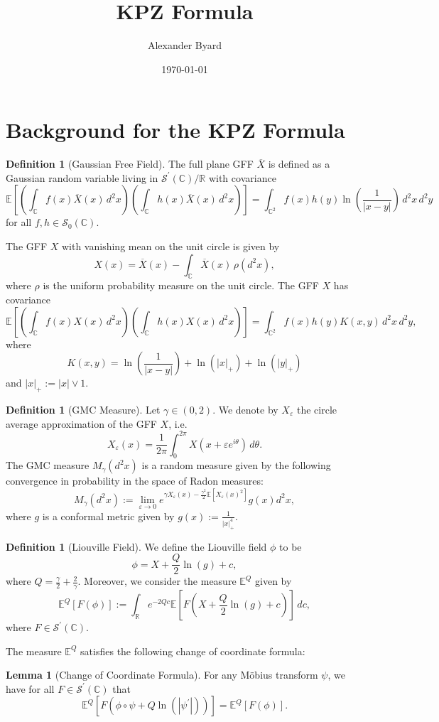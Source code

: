 \documentclass[reqno]{amsart}
\title{KPZ Formula}
\author{Alexander Byard}
\date{\today}
\let\mc\mathcal
\newcommand{\id}[4]{\int_{#1}^{#2}#3\,d#4}
\newcommand{\idd}[4]{\int_{#1}^{#2}#3\,d^2#4}
\newcommand{\im}[4]{\int_{#1}^{#2}#3\,#4}
\newcommand{\p}{\prime}
\renewcommand{\l}{\left}
\renewcommand{\r}{\right}
\newcommand{\ol}{\overline}
\newcommand{\R}{\mathbb{R}}
\newcommand{\C}{\mathbb{C}}
\newcommand{\E}{\mathbb{E}}
\renewcommand{\epsilon}{\varepsilon}
\newcommand{\e}{\epsilon}
\theoremstyle{definition}
\newtheorem{lemma}[theorem]{Lemma}
\newtheorem{definition}[theorem]{Definition}
\begin{document}
\maketitle

\section{Background for the KPZ Formula}

\begin{definition}[Gaussian Free Field]
The full plane GFF $\ol{X}$ is defined as a Gaussian random variable living in $\mc{S}^\p(\C)/\R$ with covariance
\[\E\l[\l(\idd{\C}{}{f(x)\ol{X}(x)}{x}\r)\l(\idd{\C}{}{h(x)\ol{X}(x)}{x}\r)\r]=\im{\C^2}{}{f(x)h(y)\ln\l(\frac{1}{|x-y|}\r)}{d^2x\,d^2y}\]
for all $f,h\in\mc{S}_0(\C)$.

The GFF $X$ with vanishing mean on the unit circle is given by
\[X(x)=\ol{X}(x)-\im{\C}{}{\ol{X}(x)}{\rho(d^2x)},\]
where $\rho$ is the uniform probability measure on the unit circle. The GFF $X$ has covariance
\[\E\l[\l(\idd{\C}{}{f(x)X(x)}{x}\r)\l(\idd{\C}{}{h(x)X(x)}{x}\r)\r]=\im{\C^2}{}{f(x)h(y)K(x,y)}{d^2x\,d^2y},\]
where
\[K(x,y)=\ln\l(\frac{1}{|x-y|}\r)+\ln(|x|_+)+\ln(|y|_+)\]
and $|x|_+:=|x|\vee1$.
\end{definition}

\begin{definition}[GMC Measure]
Let $\gamma\in(0,2)$. We denote by $X_\e$ the circle average approximation of the GFF $X$, i.e.
\[X_\e(x)=\frac{1}{2\pi}\id{0}{2\pi}{X(x+\e e^{i\theta})}{\theta}.\]
The GMC measure $M_\gamma(d^2x)$ is a random measure given by the following convergence in probability in the space of Radon measures:
\[M_\gamma(d^2x):=\lim_{\e\to0}e^{\gamma X_\e(x)-\frac{\gamma^2}{2}\E[X_\e(x)^2]}g(x)d^2x,\]
where $g$ is a conformal metric given by $g(x):=\frac{1}{|x|_+^4}$.
\end{definition}

\begin{definition}[Liouville Field]
We define the Liouville field $\phi$ to be
\[\phi=X+\frac{Q}{2}\ln(g)+c,\]
where $Q=\frac{\gamma}{2}+\frac{2}{\gamma}$. Moreover, we consider the measure $\E^Q$ given by
\[\E^Q[F(\phi)]:=\id{\R}{}{e^{-2Qc}\E\l[F\l(X+\frac{Q}{2}\ln(g)+c\r)\r]}{c},\]
where $F\in\mc{S}^\p(\C)$.
\end{definition}

The measure $\E^Q$ satisfies the following change of coordinate formula:

\begin{lemma}[Change of Coordinate Formula]\label{ChangeOfCoord}
For any M\"obius transform $\psi$, we have for all $F\in\mc{S}^\p(\C)$ that
\[\E^Q[F(\phi\circ\psi+Q\ln(|\psi^\p|))]=\E^Q[F(\phi)].\]
\end{lemma}
\end{document}
